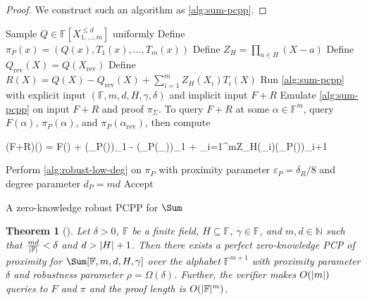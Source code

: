 \documentclass[english,12pt]{reedthesis}
\theoremstyle{plain}
\newtheorem{thm}{Theorem}[section]
\theoremstyle{definition}
\theoremstyle{remark}
\DeclarePairedDelimiter{\abs}{\lvert}{\rvert}
\begin{document}
\begin{proof}
  We construct such an algorithm as \cref{alg:sum-pcpp}. %
\end{proof}

\begin{algorithm}[htbp]
  Sample $Q \in \mathbb{F}[X_{1, \ldots, m}^{\le d}]$ uniformly\;
  Define $\pi_{P}(x) = (Q(x), T_{1}(x), \ldots, T_{m}(x))$\;
  Define $Z_{H} = \prod_{a \in H}(X - a)$\;
  Define $Q_{\text{rev}}(X) = Q(X_{\text{rev}})$\; %
  Define $R(X) = Q(X) - Q_{\text{rev}}(X) + \sum_{i=1}^{m}Z_{H}(X_{i})T_{i}(X)$\;
  Run \cref{alg:sum-pcpp} with explicit input $(\mathbb{F}, m, d, H, \gamma, \delta)$ and
  implicit input $F + R$\;
  \;
  Emulate \cref{alg:sum-pcpp} on input $F + R$ and proof $\pi_{\Sigma}$. To query
  $F + R$ at some $\alpha \in \mathbb{F}^{m}$, query $F(\alpha)$, $\pi_{P}(\alpha)$, and
  $\pi_{P}(\alpha_{\text{rev}})$, then compute
  \begin{algomathdisplay}
    (F+R)(\alpha) = F(\alpha) + (\pi_{P}(\alpha))_{1} - (\pi_{P}(\alpha_{}))_{1} + \sum_{i=1}^{m}Z_{H}(\alpha_{i})(\pi_{P}(\alpha))_{i+1}
  \end{algomathdisplay}
  Perform \cref{alg:robust-low-deg} on $\pi_{P}$ with proximity parameter
  $\varepsilon_{P} = \delta_{R}/8$ and degree parameter $d_{P} = md$\;
  Accept\;
  \caption{A zero-knowledge robust PCPP for $\Sum$~\cite[Construction
    5.2]{GOS25}}\label{alg:sum-pzk-pcpp}
\end{algorithm}

\begin{thm}[{\cite[Lemma 5.1]{GOS25}}]\label{thm:pcpp-sum-pzk}
  Let $\delta > 0$, $\mathbb{F}$ be a finite field, $H \subseteq \mathbb{F}$,
  $\gamma \in \mathbb{F}$, and $m, d \in \mathbb{N}$ such that $\frac{md}{\abs{\mathbb{F}}} < \delta$
  and $d > \abs{H} + 1$. Then there exists a perfect zero-knowledge PCP of
  proximity for $\Sum[\mathbb{F}, m, d, H, \gamma]$ over the alphabet
  $\mathbb{F}^{m+1}$ with proximity parameter $\delta$ and robustness parameter
  $\rho = \Omega(\delta)$. Further, the verifier makes $O(\abs{m})$ queries to $F$ and $\pi$
  and the proof length is $O(\abs{\mathbb{F}}^{m})$.
\end{thm}
\end{document}
